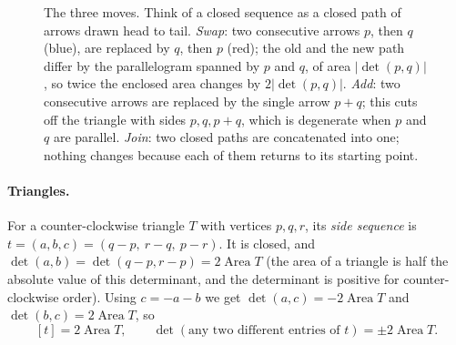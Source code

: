 \documentclass[11pt]{article}
\theoremstyle{definition}
\newcommand{\Area}{\operatorname{Area}}
\newcommand{\ar}[1]{[#1]}
\begin{document}
\begin{figure}[ht]
\centering
{}
\caption{The three moves. Think of a closed sequence as a closed path of arrows drawn head
to tail. \emph{Swap}: two consecutive arrows $p$, then $q$ (blue), are replaced by $q$, then $p$
(red); the old and the new path differ by the parallelogram spanned by $p$ and $q$, of area
$|\det(p,q)|$, so twice the enclosed area changes by $2|\det(p,q)|$. \emph{Add}: two consecutive
arrows are replaced by the single arrow $p+q$; this cuts off the triangle with sides $p,q,p+q$, which
is degenerate when $p$ and $q$ are parallel. \emph{Join}: two closed paths are concatenated into one;
nothing changes because each of them returns to its starting point.}\label{fig:moves}
\end{figure}

\paragraph{Triangles.} For a counter-clockwise triangle $T$ with vertices $p,q,r$, its \emph{side
sequence} is $t=(a,b,c)=(q-p,\ r-q,\ p-r)$. It is closed, and $\det(a,b)=\det(q-p,r-p)=2\Area T$
(the area of a triangle is half the absolute value of this determinant, and the determinant is
positive for counter-clockwise order). Using $c=-a-b$ we get $\det(a,c)=-2\Area T$ and
$\det(b,c)=2\Area T$, so
\begin{equation}\label{eq:tri}
\ar t=2\Area T,\qquad\det(\text{any two different entries of }t)=\pm2\Area T.
\end{equation}
\end{document}
